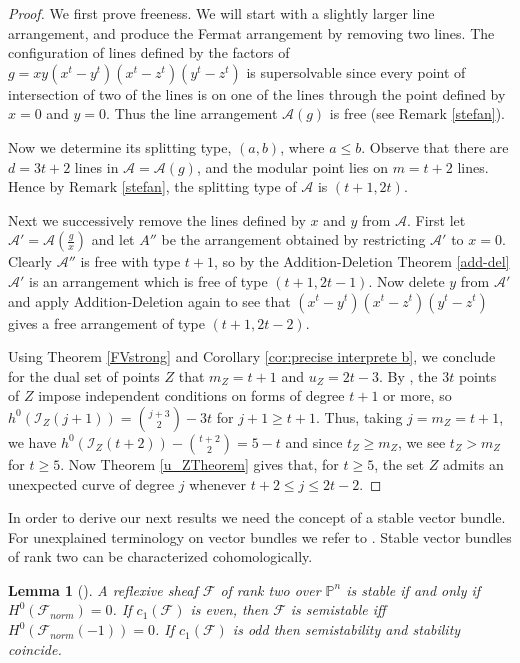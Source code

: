 \documentclass[12pt]{amsart}
\numberwithin{equation}{section}
\newtheorem{lemma}[theorem]{Lemma}
\theoremstyle{definition}
\begin{document}
\begin{proof}
We first prove freeness. We will start with a slightly larger line arrangement, and produce the Fermat 
arrangement by removing two lines.  The configuration of lines defined by the factors of $g=xy(x^t-y^t)(x^t-z^t)(y^t-z^t)$
is supersolvable since every point of intersection of two of the lines
is on one of the lines through the point defined by $x=0$ and $y=0$.
Thus the line arrangement ${\mathcal{A}} (g)$ is free (see Remark \ref{stefan}).

Now we  determine its splitting type, $(a,b)$, where $a \leq b$.
Observe that there are $d = 3t+2$ lines in ${\mathcal{A}} = {\mathcal{A}} (g)$, and the  modular point lies on $m = t+2$ lines. Hence by Remark \ref{stefan}, the splitting type of ${\mathcal{A}}$ is $(t+1,2t)$. 

Next we successively remove the lines defined by $x$ and $y$ from ${\mathcal{A}}$. First let ${\mathcal{A}}'= {\mathcal{A}} (\frac{g}{x})$ and let $A''$ be the arrangement obtained by restricting
${\mathcal{A}}'$ to $x=0$. Clearly ${\mathcal{A}}''$ is free with type $t+1$, so by  the Addition-Deletion Theorem \ref{add-del} ${\mathcal{A}}'$ is an arrangement 
which is free of type $(t+1,2t-1)$. Now delete $y$ from ${\mathcal{A}}'$ and apply Addition-Deletion again
to see that $(x^t-y^t)(x^t-z^t)(y^t-z^t)$ gives a free arrangement of type $(t+1,2t-2)$. 

Using Theorem \ref{FVstrong} and Corollary \ref{cor:precise interprete b}, we conclude for the dual set of points $Z$ that $m_Z = t+1$ and $u_Z = 2t -3$. 
By \cite[Theorem III.1(a)]{Ha},
the $3t$  points of $Z$  impose independent conditions on forms of degree $t+1$ or more,
so $h^0(\mathcal I_Z(j+1))=\binom{j+3}{2}-3t$ for $j+1\geq t+1$.  Thus, taking $j=m_Z=t+1$, we have $h^0(\mathcal I_Z(t+2))-\binom{t+2}{2}=5-t$ 
and since $t_Z\geq m_Z$, we see $t_Z>m_Z$ for $t\geq 5$. Now Theorem \ref{u_ZTheorem} gives that,  for $t \geq 5$, the set  $Z$ admits an unexpected curve of degree $j$  whenever  $t+2 \leq j \leq 2t-2$. 
\end{proof}

In order to derive our next results we need the concept of a stable vector bundle. For unexplained terminology on vector bundles we refer to \cite{OSS}. Stable vector bundles of rank two can be characterized cohomologically. 

\begin{lemma} [{\cite[Lemma 3.1]{H}}] 
          \label{stable lemma}
A reflexive sheaf $\mathcal F$ of rank two over $\mathbb P^n$ is stable if and only if $H^0(\mathcal F_{norm}) = 0$.  If $c_1(\mathcal F)$ is even, then $\mathcal F$ is semistable iff $H^0(\mathcal F_{norm}(-1)) = 0$.  If $c_1(\mathcal F)$ is odd then semistability and stability coincide.
\end{lemma} 
\end{document}
